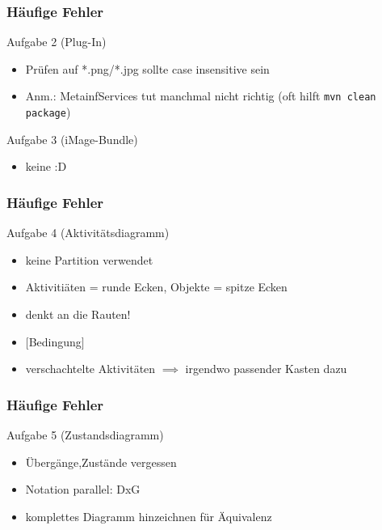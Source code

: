 \documentclass[18pt]{beamer}
\begin{document}
	\begin{frame}
		\frametitle{Häufige Fehler}
		\begin{block}{Aufgabe 2 (Plug-In)}
			\begin{itemize}
				\pause
				\item Prüfen auf *.png/*.jpg sollte case insensitive sein \pause
				\item Anm.: MetainfServices tut manchmal nicht richtig (oft hilft \texttt{mvn clean package}) \pause
			\end{itemize}
		\end{block}
		\begin{block}{Aufgabe 3 (iMage-Bundle)}
			\begin{itemize}
				\item keine :D
			\end{itemize}
		\end{block}
	\end{frame}

	\begin{frame}
		\frametitle{Häufige Fehler}
		\begin{block}{Aufgabe 4 (Aktivitätsdiagramm)}
			\begin{itemize}
				\pause 
				\item keine Partition verwendet \pause
				\item Aktivitiäten = runde Ecken, Objekte = spitze Ecken \pause
				\item denkt an die Rauten! \pause
				\item $\lbrack$Bedingung$\rbrack$ \pause
				\item verschachtelte Aktivitäten $\implies$ irgendwo passender Kasten dazu
			\end{itemize}
		\end{block}
	\end{frame}

	\begin{frame}
		\frametitle{Häufige Fehler}
		\begin{block}{Aufgabe 5 (Zustandsdiagramm)}
			\begin{itemize}
				\pause
				\item Übergänge,Zustände vergessen \pause
				\item Notation parallel: DxG \pause
				\item komplettes Diagramm hinzeichnen für Äquivalenz \pause
			\end{itemize}
		\end{block}
	\end{frame}
\end{document}
